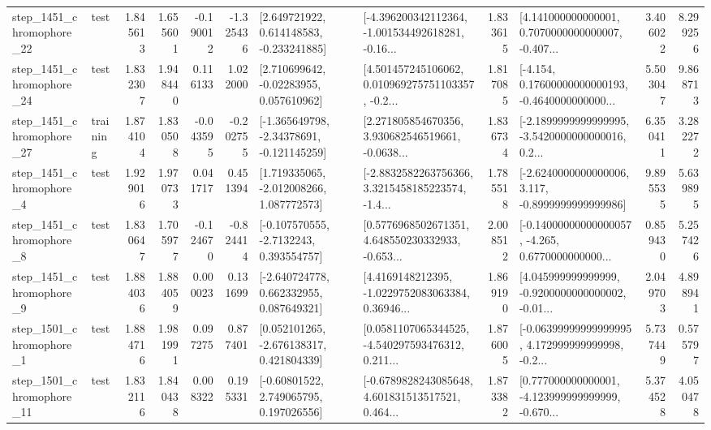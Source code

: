 \begin{tabular}{llrrrrllrlrr}
 step\_1451\_chromophore\_22 &      test &      1.845613 &    1.655601 &     -0.190012 & -1.325436 &    [2.649721922, 0.614148583, -0.233241885] &  [-4.396200342112364, -1.001534492618281, -0.16... &       1.833615 &  [4.141000000000001, 0.7070000000000007, -0.407... &            3.406022 &          8.299256 \\
 step\_1451\_chromophore\_24 &      test &      1.832307 &    1.948440 &      0.116133 &  1.022000 &     [2.710699642, -0.02283955, 0.057610962] &  [4.501457245106062, 0.010969275751103357, -0.2... &       1.817085 &  [-4.154, 0.17600000000000193, -0.4640000000000... &            5.503047 &          9.868713 \\
 step\_1451\_chromophore\_27 &  training &      1.874104 &    1.830508 &     -0.043595 & -0.202755 &   [-1.365649798, -2.34378691, -0.121145259] &  [2.271805854670356, 3.930682546519661, -0.0638... &       1.836734 &  [-2.1899999999999995, -3.5420000000000016, 0.2... &            6.350411 &          3.282272 \\
  step\_1451\_chromophore\_4 &      test &      1.929016 &    1.970733 &      0.041717 &  0.451394 &    [1.719335065, -2.012008266, 1.087772573] &  [-2.8832582263756366, 3.3215458185223574, -1.4... &       1.785518 &  [-2.6240000000000006, 3.117, -0.8999999999999986] &            9.895535 &          5.639895 \\
  step\_1451\_chromophore\_8 &      test &      1.830647 &    1.705977 &     -0.124670 & -0.824414 &     [-0.107570555, -2.7132243, 0.393554757] &  [0.5776968502671351, 4.648550230332933, -0.653... &       2.008512 &  [-0.14000000000000057, -4.265, 0.6770000000000... &            0.859430 &          5.257426 \\
  step\_1451\_chromophore\_9 &      test &      1.884036 &    1.884059 &      0.000023 &  0.131699 &    [-2.640724778, 0.662332955, 0.087649321] &  [4.4169148212395, -1.0229752083063384, 0.36946... &       1.869190 &  [4.045999999999999, -0.9200000000000002, -0.01... &            2.049703 &          4.898941 \\
  step\_1501\_chromophore\_1 &      test &      1.884716 &    1.981991 &      0.097275 &  0.877401 &    [0.052101265, -2.676138317, 0.421804339] &  [0.0581107065344525, -4.540297593476312, 0.211... &       1.876005 &  [-0.06399999999999995, 4.172999999999998, -0.2... &            5.737449 &          0.575797 \\
 step\_1501\_chromophore\_11 &      test &      1.832116 &    1.840438 &      0.008322 &  0.195331 &     [-0.60801522, 2.749065795, 0.197026556] &  [-0.6789828243085648, 4.601831513517521, 0.464... &       1.873382 &  [0.777000000000001, -4.123999999999999, -0.670... &            5.374528 &          4.050478 \\

\end{tabular}
